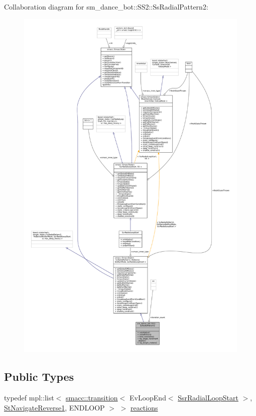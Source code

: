 Collaboration diagram for sm\+\_\+dance\+\_\+bot\+:\+:S\+S2\+:\+:Ss\+Radial\+Pattern2\+:
\nopagebreak
\begin{figure}[H]
\begin{center}
\leavevmode
\includegraphics[width=350pt]{structsm__dance__bot_1_1SS2_1_1SsRadialPattern2__coll__graph}
\end{center}
\end{figure}
\subsection*{Public Types}
\begin{DoxyCompactItemize}
\item 
typedef mpl\+::list$<$ \hyperlink{classsmacc_1_1transition}{smacc\+::transition}$<$ Ev\+Loop\+End$<$ \hyperlink{structSsrRadialLoopStart}{Ssr\+Radial\+Loop\+Start} $>$, \hyperlink{structsm__dance__bot_1_1StNavigateReverse1}{St\+Navigate\+Reverse1}, E\+N\+D\+L\+O\+OP $>$ $>$ \hyperlink{structsm__dance__bot_1_1SS2_1_1SsRadialPattern2_a8eebdfef76e9650546653ddc48e9bfe5}{reactions}
\end{DoxyCompactItemize}
